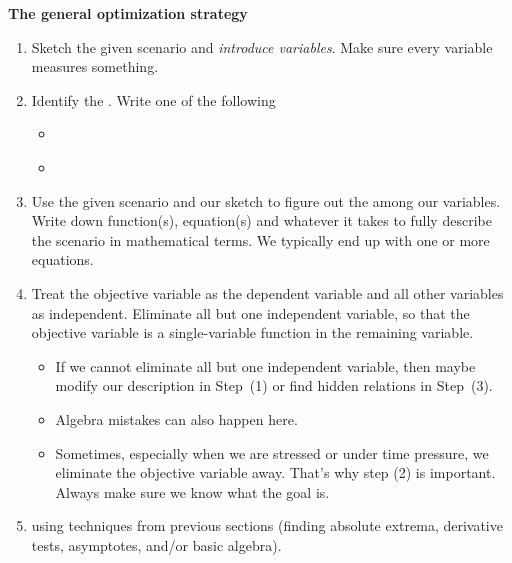 \documentclass[../main.tex]{subfiles}
\begin{document}
\textbf{The general optimization strategy}
\label{page:optimization-strategy}
\begin{enumerate}[label=(\arabic*)]
  \item Sketch the given scenario and \emph{introduce variables}. Make sure every variable measures something.

  \item Identify the . Write one of the following
    \begin{itemize}
      \item \emph{}
      \item \emph{}
    \end{itemize}

  \item Use the given scenario and our sketch to figure out the  among our variables. Write down function(s), equation(s) and whatever it takes to fully describe the scenario in mathematical terms. We typically end up with one or more equations. 

  \item Treat the objective variable as the dependent variable and all other variables as independent. Eliminate all but one independent variable, so that the objective variable is a single-variable function in the remaining variable.

    \begin{itemize}
      \item If we cannot eliminate all but one independent variable, then maybe modify our description in Step~(1) or find hidden relations in Step~(3).
      \item Algebra mistakes can also happen here.
      \item Sometimes, especially when we are stressed or under time pressure, we eliminate the objective variable away. That's why step (2) is important. Always make sure we know what the goal is.
    \end{itemize}

  \item {} using techniques from previous sections (finding absolute extrema, derivative tests, asymptotes, and/or basic algebra).

\end{enumerate}
\clearpage
\end{document}
